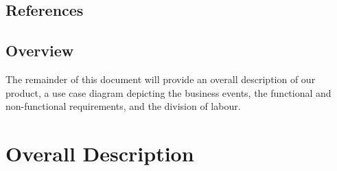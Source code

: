 \documentclass[]{article}
\begin{document}
	\subsection{References}
	\label{sub:references}
	
	\subsection{Overview}
	\label{sub:overview}
	The remainder of this document will provide an overall description of our product, a use case diagram depicting the business events, the functional and non-functional requirements, and the division of labour. 
		
	
	
	\section{Overall Description}
	\label{sec:overall_description}
	
	
\end{document}
